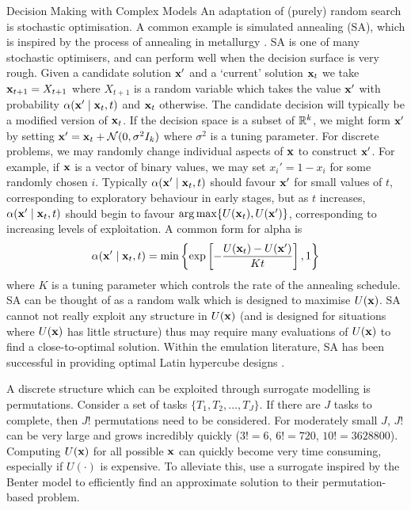 \begin{chapter}{Decision Making with Complex Models \label{Chap:optimisation}}
An adaptation of (purely) random search is stochastic optimisation. A common example is simulated annealing (SA), which is inspired by the process of annealing in metallurgy \citep{Kirkpatrick1983, Schneider2006}. SA is one of many stochastic optimisers, and can perform well when the decision surface is very rough. Given a candidate solution $\mathbf{x}'$ and a `current' solution $\mathbf{x}_t$ we take $\mathbf{x}_{t+1} = X_{t+1}$ where $X_{t+1}$ is a random variable which takes the value $\mathbf{x}'$ with probability $\alpha( \mathbf{x}' \mid \mathbf{x}_{t}, t)$ and $\mathbf{x}_t$ otherwise. The candidate decision will typically be a modified version of $\mathbf{x}_t$. If the decision space is a subset of $\mathbb{R}^k$, we might form $\mathbf{x}'$ by setting $\mathbf{x}' = \mathbf{x}_t + \mathcal{N}(0, \sigma^2I_k)$ where $\sigma^2$ is a tuning parameter. For discrete problems, we may randomly change individual aspects of $\mathbf{x}$ to construct $\mathbf{x}'$. For example, if $\mathbf{x}$ is a vector of binary values, we may set $x_i' = 1 - x_i$ for some randomly chosen $i$. Typically $\alpha(\mathbf{x}' \mid \mathbf{x}_{t}, t)$ should favour $\mathbf{x}'$ for small values of $t$, corresponding to exploratory behaviour in early stages, but as $t$ increases, $\alpha(\mathbf{x}' \mid \mathbf{x}_{t}, t)$ should begin to favour $\operatorname*{arg\,max} \{U(\mathbf{x}_t), U(\mathbf{x}')\}$, corresponding to increasing levels of exploitation. A common form for alpha is
\begin{equation}
 \alpha(\mathbf{x}' \mid \mathbf{x}_{t}, t) = \min \left\{ \exp\left[-\frac{U(\mathbf{x}_t) - U(\mathbf{x}')}{Kt}\right], 1\right\}
\end{equation}
where $K$ is a tuning parameter which controls the rate of the annealing schedule. SA can be thought of as a random walk which is designed to maximise $U(\mathbf{x})$. SA cannot not really exploit any structure in $U(\mathbf{x})$ (and is designed for situations where $U(\mathbf{x})$ has little structure) thus may require many evaluations of $U(\mathbf{x})$ to find a close-to-optimal solution. Within the emulation literature, SA has been successful in providing optimal Latin hypercube designs \citep{Morris1995, Pholdee2015}.

A discrete structure which can be exploited through surrogate modelling is permutations. Consider a set of tasks $\{T_1, T_2, \ldots, T_J\}$. If there are $J$ tasks to complete, then $J!$ permutations need to be considered. For moderately small $J$, $J!$ can be very large and grows incredibly quickly ($3! = 6$, $6! = 720$, $10! = 3628800$). Computing $U(\mathbf{x})$ for all possible $\mathbf{x}$ can quickly become very time consuming, especially if $U(\cdot)$ is expensive. To alleviate this, \citet{Wilson2018} use a surrogate inspired by the Benter model \citep{Benter1994} to efficiently find an approximate solution to their permutation-based problem.

\end{chapter}
